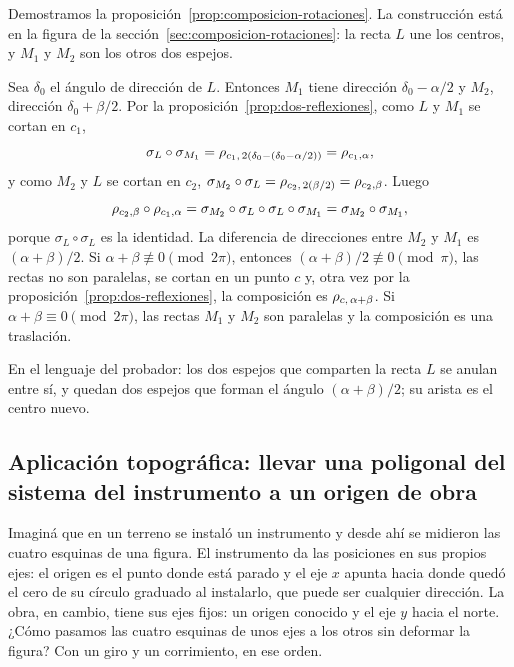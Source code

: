 Demostramos la proposición~\ref{prop:composicion-rotaciones}. La construcción está en la
figura de la sección~\ref{sec:composicion-rotaciones}: la recta \(L\) une los centros, y
\(M_1\) y \(M_2\) son los otros dos espejos.

\begin{demostracion}
Sea \(\delta_0\) el ángulo de dirección de \(L\). Entonces \(M_1\) tiene dirección
\(\delta_0-\alpha/2\) y \(M_2\), dirección \(\delta_0+\beta/2\). Por la
proposición~\ref{prop:dos-reflexiones}, como \(L\) y \(M_1\) se cortan en \(c_1\),
\[
\sigma_L\circ\sigma_{M_1}=\rho_{c_1,\,2(\delta_0-(\delta_0-\alpha/2))}=\rho_{c_1,\alpha},
\]
y como \(M_2\) y \(L\) se cortan en \(c_2\),
\(\sigma_{M_2}\circ\sigma_L=\rho_{c_2,\,2(\beta/2)}=\rho_{c_2,\beta}\). Luego
\[
\rho_{c_2,\beta}\circ\rho_{c_1,\alpha}
=\sigma_{M_2}\circ\sigma_L\circ\sigma_L\circ\sigma_{M_1}
=\sigma_{M_2}\circ\sigma_{M_1},
\]
porque \(\sigma_L\circ\sigma_L\) es la identidad. La diferencia de direcciones entre \(M_2\) y
\(M_1\) es \((\alpha+\beta)/2\). Si \(\alpha+\beta\not\equiv0\pmod{2\pi}\), entonces
\((\alpha+\beta)/2\not\equiv0\pmod{\pi}\), las rectas no son paralelas, se cortan en un punto
\(c\) y, otra vez por la proposición~\ref{prop:dos-reflexiones}, la composición es
\(\rho_{c,\,\alpha+\beta}\). Si \(\alpha+\beta\equiv0\pmod{2\pi}\), las rectas \(M_1\) y
\(M_2\) son paralelas y la composición es una traslación.
\end{demostracion}

En el lenguaje del probador: los dos espejos que comparten la recta \(L\) se anulan entre sí,
y quedan dos espejos que forman el ángulo \((\alpha+\beta)/2\); su arista es el centro nuevo.

\subsection{Aplicación topográfica: llevar una poligonal del sistema del instrumento a un origen de obra}\label{sec:aplicacion-poligonal}

Imaginá que en un terreno se instaló un instrumento y desde ahí se midieron las cuatro esquinas
de una figura. El instrumento da las posiciones en sus propios ejes: el origen es el punto donde
está parado y el eje \(x\) apunta hacia donde quedó el cero de su círculo graduado al
instalarlo, que puede ser cualquier dirección. La obra, en cambio, tiene sus ejes fijos: un
origen conocido y el eje \(y\) hacia el norte. ¿Cómo pasamos las cuatro esquinas de unos ejes a
los otros sin deformar la figura? Con un giro y un corrimiento, en ese orden.

